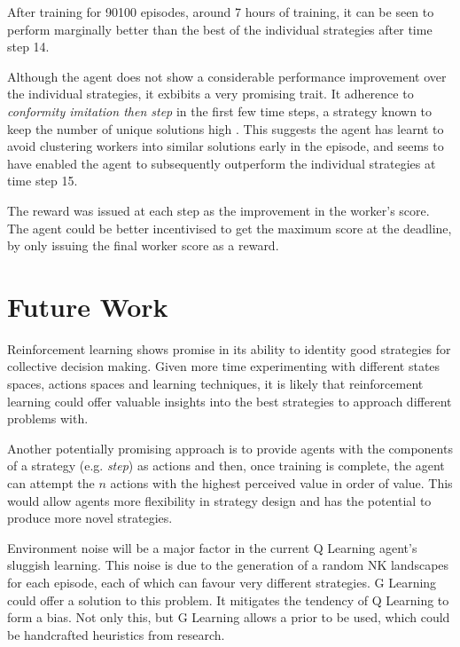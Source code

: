 \documentclass[conference]{IEEEtran}
\begin{document}
After training for 90100 episodes, around 7 hours of training,
it can be seen to perform marginally better
than the best of the individual strategies after time step 14.

Although the agent does not show a considerable performance improvement
over the individual strategies,
it exbibits a very promising trait.
It adherence to \emph{conformity imitation then step}
in the first few time steps,
a strategy known to keep the number of unique solutions
high \cite{sociallearning}.
This suggests the agent has learnt to avoid
clustering workers into similar solutions early in the episode,
and seems to have enabled the agent to subsequently outperform
the individual strategies at time step 15.

The reward was issued at each step as the improvement in the worker's score.
The agent could be better incentivised to get the maximum score at the deadline,
by only issuing the final worker score as a reward.


\section{Future Work}
Reinforcement learning shows promise
in its ability to identity good strategies for collective decision making.
Given more time experimenting with different
states spaces, actions spaces and learning techniques,
it is likely that reinforcement learning could offer valuable insights
into the best strategies to approach different problems with.

Another potentially promising approach is to provide agents
with the components of a strategy (e.g. \emph{step}) as actions
and then, once training is complete, the agent can attempt the $n$ actions
with the highest perceived value in order of value.
This would allow agents more flexibility in strategy design
and has the potential to produce more novel strategies.

Environment noise will be a major factor in
the current Q Learning agent's sluggish learning.
This noise is due to the generation of a random NK landscapes for each episode,
each of which can favour very different strategies.
G Learning \cite{glearning}
could offer a solution to this problem.
It mitigates the tendency of Q Learning to form a bias.
Not only this, but G Learning allows a prior to be used,
which could be handcrafted heuristics from research.


{}

\end{document}
